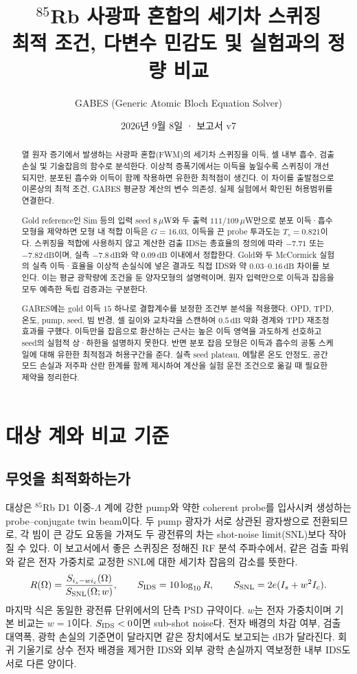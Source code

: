 \documentclass[11pt,a4paper]{article}
\title{\textbf{$^{85}$Rb 사광파 혼합의 세기차 스퀴징}\\[8pt]
\large 최적 조건, 다변수 민감도 및 실험과의 정량 비교}
\author{GABES (Generic Atomic Bloch Equation Solver)}
\date{2026년 9월 8일 · 보고서 v7}
\newcommand{\dB}{\,\mathrm{dB}}
\begin{document}
\maketitle
\begin{abstract}
열 원자 증기에서 발생하는 사광파 혼합(FWM)의 세기차 스퀴징을 이득, 셀 내부
흡수, 검출 손실 및 기술잡음의 함수로 분석한다. 이상적 증폭기에서는 이득을
높일수록 스퀴징이 개선되지만, 분포된 흡수와 이득이 함께 작용하면 유한한
최적점이 생긴다. 이 차이를 출발점으로 이론상의 최적 조건, GABES 평균장
계산의 변수 의존성, 실제 실험에서 확인된 허용범위를 연결한다.

Gold reference인 Sim 등\cite{sim}의 입력 seed $8\,\mu$W와 두 출력
$111/109\,\mu$W만으로 분포 이득·흡수 모형을 제약하면 모형 내 적합 이득은
$G=16.03$, 이득을 끈 probe 투과도는 $T_s=0.821$이다. 스퀴징을 적합에
사용하지 않고 계산한 검출 IDS는 총효율의 정의에 따라 $-7.71$ 또는
$-7.82\dB$이며, 실측 $-7.8\dB$와 약 $0.09\dB$ 이내에서 정합한다.
Gold와 두 McCormick 실험의 실측 이득·효율을 이상적 손실식에 넣은 결과도
직접 IDS와 약 $0.03$--$0.16\dB$ 차이를 보인다. 이는 평균 광학량에 조건을
둔 양자모형의 설명력이며, 원자 입력만으로 이득과 잡음을 모두 예측한
독립 검증과는 구분한다.

GABES에는 gold 이득 $15$ 하나로 결합계수를 보정한 조건부 분석을 적용했다.
OPD, TPD, 온도, pump, seed, 빔 반경, 셀 길이와 교차각을 스캔하여
$0.5\dB$ 악화 경계와 TPD 재조정 효과를 구했다. 이득만을 잡음으로 환산하는
근사는 높은 이득 영역을 과도하게 선호하고 seed의 실험적 상·하한을 설명하지
못한다. 반면 분포 잡음 모형은 이득과 흡수의 공통 스케일에 대해 유한한
최적점과 허용구간을 준다. 실측 seed plateau, 에탈론 온도 안정도,
공간모드 손실과 저주파 산란 한계를 함께 제시하여 계산을 실험 운전 조건으로
옮길 때 필요한 제약을 정리한다.
\end{abstract}
\clearpage
\begingroup\small\setlength{\parskip}{0pt}\tableofcontents\endgroup
\clearpage

\section{대상 계와 비교 기준}
\subsection{무엇을 최적화하는가}
대상은 $^{85}$Rb D1 이중-$\Lambda$ 계에 강한 pump와 약한 coherent probe를
입사시켜 생성하는 probe--conjugate twin beam이다. 두 pump 광자가 서로
상관된 광자쌍으로 전환되므로, 각 빔이 큰 강도 요동을 가져도 두 광전류의
차는 shot-noise limit(SNL)보다 작아질 수 있다. 이 보고서에서 좋은 스퀴징은
정해진 RF 분석 주파수에서, 같은 검출 파워와 같은 전자 가중치로 교정한
SNL에 대한 세기차 잡음의 감소를 뜻한다.
\begin{equation}
 R(\Omega)=\frac{S_{i_s-wi_c}(\Omega)}{S_{\rm SNL}(\Omega;w)},\qquad
 S_{\rm IDS}=10\log_{10}R,\qquad S_{\rm SNL}=2e(I_s+w^2I_c).
 \label{eq:snl}
\end{equation}
마지막 식은 동일한 광전류 단위에서의 단측 PSD 규약이다. $w$는 전자
가중치이며 기본 비교는 $w=1$이다. $S_{\rm IDS}<0$이면 sub-shot noise다.
전자 배경의 차감 여부, 검출 대역폭, 광학 손실의 기준면이 달라지면 같은
장치에서도 보고되는 dB가 달라진다. 회귀 기울기로 상수 전자 배경을 제거한
IDS와 외부 광학 손실까지 역보정한 내부 IDS도 서로 다른 양이다.
\end{document}
